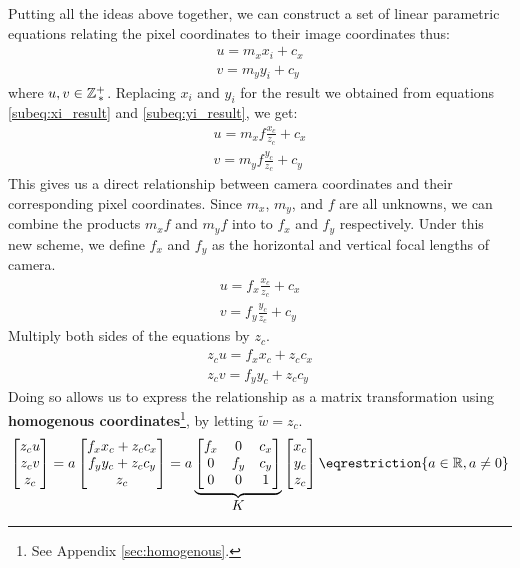 Putting all the ideas above together, we can construct a set of linear parametric equations relating the pixel coordinates to their image coordinates thus:
\begin{align*}
    u = m_x x_i + c_x \\
    v = m_y y_i + c_y
\end{align*}
where $u, v \in \mathbb{Z}^+_{\,*}$. Replacing $x_i$ and $y_i$ for the result we obtained from equations \ref{subeq:xi_result} and \ref{subeq:yi_result}, we get:
\begin{align*}
    u = m_x f \frac{x_c}{z_c} + c_x \\
    v = m_y f \frac{y_c}{z_c} + c_y
\end{align*}
This gives us a direct relationship between camera coordinates and their corresponding pixel coordinates. Since $m_x$, $m_y$, and $f$ are all unknowns, we can combine the products $m_x f$ and $m_y f$ into to $f_x$ and $f_y$ respectively. Under this new scheme, we define $f_x$ and $f_y$ as the horizontal and vertical focal lengths of camera.
\begin{gather}
    u = f_x \frac{x_c}{z_c} + c_x \\
    v = f_y \frac{y_c}{z_c} + c_y
\end{gather}
Multiply both sides of the equations by $z_c$.
\begin{subequations}
    \begin{gather*}
        z_c u = f_x x_c + z_c c_x \\
        z_c v = f_y y_c + z_c c_y
    \end{gather*}
\end{subequations}
Doing so allows us to express the relationship as a matrix transformation using \textbf{homogenous coordinates}\footnote{See Appendix \ref{sec:homogenous}.}, by letting $\widetilde{w} = z_c$.
\begin{equation} \label{eq:cali}
    \begin{bmatrix}
        z_c u \\ z_c v \\ z_c
    \end{bmatrix}
    =
    a
    \begin{bmatrix}
        f_x x_c + z_c c_x \\ f_y y_c + z_c c_y \\ z_c
    \end{bmatrix}
    =
    a
    \underbrace{
        \begin{bmatrix}
            f_x & 0   & c_x \\
            0   & f_y & c_y \\
            0   & 0   & 1
        \end{bmatrix}
    }_{\mathlarger{K}}
    \begin{bmatrix}
        x_c \\ y_c \\ z_c
    \end{bmatrix}
    \eqrestriction{a \in \Real, a \neq 0}
\end{equation}


